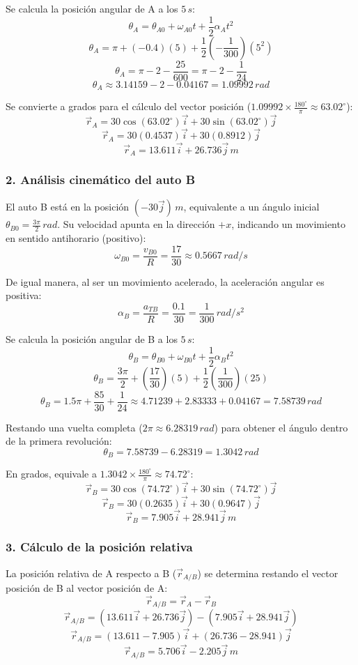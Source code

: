 \documentclass[12pt, a4paper]{article}
\begin{document}
Se calcula la posición angular de A a los $5 \, \si{s}$:
$$ \theta_A = \theta_{A0} + \omega_{A0} t + \frac{1}{2}\alpha_A t^2 $$
$$ \theta_A = \pi + (-0.4)(5) + \frac{1}{2}\left(-\frac{1}{300}\right)(5^2) $$
$$ \theta_A = \pi - 2 - \frac{25}{600} = \pi - 2 - \frac{1}{24} $$
$$ \theta_A \approx 3.14159 - 2 - 0.04167 = 1.09992 \, \si{rad} $$

Se convierte a grados para el cálculo del vector posición ($1.09992 \times \frac{180^\circ}{\pi} \approx 63.02^\circ$):
$$ \vec{r}_A = 30\cos(63.02^\circ)\vec{i} + 30\sin(63.02^\circ)\vec{j} $$
$$ \vec{r}_A = 30(0.4537)\vec{i} + 30(0.8912)\vec{j} $$
$$ \vec{r}_A = 13.611\vec{i} + 26.736\vec{j} \, \si{m} $$

\subsubsection*{2. Análisis cinemático del auto B}
El auto B está en la posición $( -30\vec{j} ) \, \si{m}$, equivalente a un ángulo inicial $\theta_{B0} = \frac{3\pi}{2} \, \si{rad}$.
Su velocidad apunta en la dirección $+x$, indicando un movimiento en sentido antihorario (positivo):
$$ \omega_{B0} = \frac{v_{B0}}{R} = \frac{17}{30} \approx 0.5667 \, \si{rad/s} $$

De igual manera, al ser un movimiento acelerado, la aceleración angular es positiva:
$$ \alpha_B = \frac{a_{TB}}{R} = \frac{0.1}{30} = \frac{1}{300} \, \si{rad/s^2} $$

Se calcula la posición angular de B a los $5 \, \si{s}$:
$$ \theta_B = \theta_{B0} + \omega_{B0} t + \frac{1}{2}\alpha_B t^2 $$
$$ \theta_B = \frac{3\pi}{2} + \left(\frac{17}{30}\right)(5) + \frac{1}{2}\left(\frac{1}{300}\right)(25) $$
$$ \theta_B = 1.5\pi + \frac{85}{30} + \frac{1}{24} \approx 4.71239 + 2.83333 + 0.04167 = 7.58739 \, \si{rad} $$

Restando una vuelta completa ($2\pi \approx 6.28319 \, \si{rad}$) para obtener el ángulo dentro de la primera revolución:
$$ \theta_B = 7.58739 - 6.28319 = 1.3042 \, \si{rad} $$

En grados, equivale a $1.3042 \times \frac{180^\circ}{\pi} \approx 74.72^\circ$:
$$ \vec{r}_B = 30\cos(74.72^\circ)\vec{i} + 30\sin(74.72^\circ)\vec{j} $$
$$ \vec{r}_B = 30(0.2635)\vec{i} + 30(0.9647)\vec{j} $$
$$ \vec{r}_B = 7.905\vec{i} + 28.941\vec{j} \, \si{m} $$

\subsubsection*{3. Cálculo de la posición relativa}
La posición relativa de A respecto a B ($\vec{r}_{A/B}$) se determina restando el vector posición de B al vector posición de A:
$$ \vec{r}_{A/B} = \vec{r}_A - \vec{r}_B $$
$$ \vec{r}_{A/B} = (13.611\vec{i} + 26.736\vec{j}) - (7.905\vec{i} + 28.941\vec{j}) $$
$$ \vec{r}_{A/B} = (13.611 - 7.905)\vec{i} + (26.736 - 28.941)\vec{j} $$
$$ \vec{r}_{A/B} = 5.706\vec{i} - 2.205\vec{j} \, \si{m} $$
\end{document}
